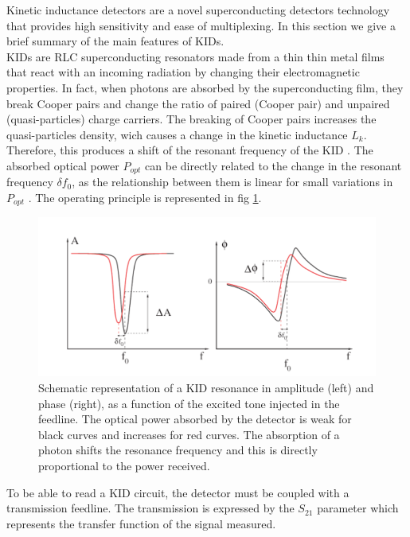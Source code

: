 
Kinetic inductance detectors are a novel superconducting detectors technology that provides high sensitivity and ease of multiplexing. In this section we give a brief summary of the main features of KIDs.\\
KIDs are RLC superconducting resonators made from a thin thin metal films that react with an incoming radiation by changing their electromagnetic properties. In fact, when photons are absorbed by the superconducting film, they break Cooper pairs and change the ratio of paired (Cooper pair) and unpaired (quasi-particles) charge carriers. The breaking of Cooper pairs increases the quasi-particles density, wich causes a change in the kinetic inductance $L_{k}$. Therefore, this produces a shift of the resonant frequency of the KID \citep{2013A&A...551L..12C}. The absorbed optical power $P_{opt}$ can be directly related to the change in the resonant frequency $\delta f_{0}$, as the relationship between them is linear for small variations in $P_{opt}$ \citep{2010ApPhL..96z3511S}. The operating principle is represented in fig \ref{resonance}.\\

\begin{figure}[h]
\center
	\includegraphics[scale=0.35]{resonance.png}
	\caption{Schematic representation of a KID resonance in amplitude (left) and phase (right), as a function of the excited tone injected in the feedline. The optical power absorbed by the detector is weak for black curves and increases for red curves. The absorption of a photon shifts the resonance frequency and this is directly proportional to the power received.}
	\label{resonance}
\end{figure}

To be able to read a KID circuit, the detector must be coupled with a transmission feedline. The transmission is expressed by the $S_{21}$ parameter which represents the transfer function of the signal measured. 

